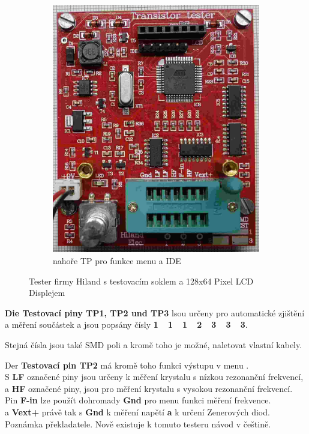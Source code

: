 \begin{figure}[H]
\begin{subfigure}[b]{.5\textwidth}
    \includegraphics[width=.756\textwidth]{../PNG/Hi_o.jpg}
    \caption{nahoře TP pro funkce menu a IDE}
  \end{subfigure}
  \caption{Tester firmy Hiland s testovacím soklem a 128x64 Pixel LCD Displejem}
  \label{fig:Hiland}
\end{figure}

{\textbf {Die Testovací piny TP1, TP2 und TP3}} lsou určeny pro automatické zjištění a měření součástek a jsou popsány čísly {\textbf {1~~1~~1~~2~~3~~3~~3}}.

Stejná čísla jsou také SMD poli a kromě toho je možné, naletovat vlastní kabely.

Der \textbf {Testovací pin TP2} má kromě toho funkci výstupu v menu .
\\S \textbf{ LF} označené piny jsou určeny k měření krystalu s nízkou rezonanční frekvencí,
\\a \textbf{ HF} označené piny, jsou pro měření krystalu s vysokou rezonanční frekvencí.
\\
Pin \textbf {F-in} lze použít dohromady {\textbf {Gnd}} pro menu funkci měření frekvence.
\\a \textbf {Vext+} právě tak s {\textbf {Gnd}} k měření napětí {\textbf a} k určení Zenerových diod.\\

Poznámka překladatele. Nově existuje k tomuto testeru návod v češtině.

